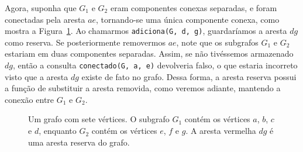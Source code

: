 Agora, suponha que $G_1$ e $G_2$ eram componentes conexas separadas, e foram  conectadas pela aresta $ae$, tornando-se uma única componente conexa, como mostra a Figura~\ref{fig:graph_with_reserve_edges}. Ao chamarmos \texttt{adiciona(G, d, g)}, guardaríamos a aresta $dg$ como reserva. Se posteriormente removermos $ae$, note que os subgrafos $G_1$ e $G_2$ estariam em duas componentes separadas. Assim, se não tivéssemos armazenado $dg$, então a consulta \texttt{conectado(G, a, e)} devolveria falso, o que estaria incorreto visto que a aresta $dg$ existe de fato no grafo. Dessa forma, a aresta reserva possui a função de substituir a aresta removida, como veremos adiante, mantendo a conexão entre $G_1$ e $G_2$.

\begin{figure}
    \centering
    \caption{Um grafo com sete vértices. O subgrafo $G_1$ contém os vértices $a$, $b$, $c$ e $d$, enquanto $G_2$ contém os vértices $e$, $f$ e $g$. A aresta vermelha $dg$ é uma aresta reserva do grafo.}
    \label{fig:graph_with_reserve_edges}
\end{figure}

